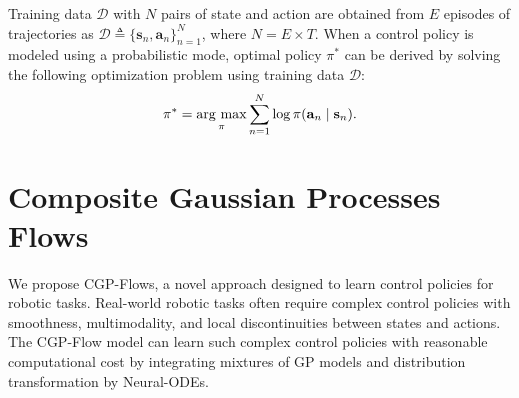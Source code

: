 \documentclass[sn-mathphys-num]{sn-jnl}
\newcommand{\argmax}{\mathop{\rm arg~max}\limits} %
\begin{document}
Training data $\mathcal{D}$ with $N$ pairs of state and action are obtained from $E$ episodes of trajectories as $\mathcal{D}\triangleq \{\mathbf{s}_n, \mathbf{a}_n\}_{n=1}^{N}$, where $N=E\times T$.
When a control policy is modeled using a probabilistic mode, optimal policy $\pi^{*}$ can be derived by solving the following optimization problem using training data $\mathcal D$:
\begin{align}\label{eq:bc:policy}
    \pi^{*} = \argmax_\pi  \sum_{n=1}^{N} \log \pi(\mathbf{a}_n \mid \mathbf{s}_n).
\end{align}


\section{Composite Gaussian Processes Flows}
We propose CGP-Flows, a novel approach designed to learn control policies for robotic tasks.
Real-world robotic tasks often require complex control policies with smoothness, multimodality, and local discontinuities between states and actions.
The CGP-Flow model can learn such complex control policies with reasonable computational cost by integrating mixtures of GP models and distribution transformation by Neural-ODEs.
\end{document}

